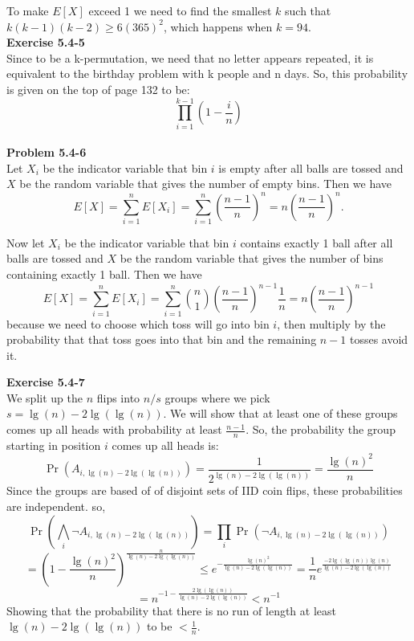 \documentclass{article}
\begin{document}
To make $E[X]$ exceed 1 we need to find the smallest $k$ such that $k(k-1)(k-2) \geq 6(365)^2$, which happens when $k = 94$.\\

\noindent\textbf{Exercise 5.4-5}\\

Since to be a k-permutation, we need that no letter appears repeated, it is equivalent to the birthday problem with k people and n days. So, this probability is given on the top of page 132 to be:
\[
\prod_{i=1}^{k-1} \left(1-\frac{i}{n}\right)
\]\\

\noindent\textbf{Problem 5.4-6}\\

Let $X_i$ be the indicator variable that bin $i$ is empty after all balls are tossed and $X$ be the random variable that gives the number of empty bins.  Then we have
\[ E[X] = \sum_{i=1}^n E[X_i] = \sum_{i=1}^n \left(\frac{n-1}{n}\right)^n = n\left(\frac{n-1}{n}\right)^n.\]

Now let $X_i$ be the indicator variable that bin $i$ contains exactly 1 ball after all balls are tossed and $X$ be the random variable that gives the number of bins containing exactly 1 ball.  Then we have
\[ E[X] = \sum_{i=1}^n E[X_i] = \sum_{i=1}^n {n \choose 1}\left(\frac{n-1}{n}\right)^{n-1}\frac{1}{n} = n\left(\frac{n-1}{n}\right)^{n-1} \]
because we need to choose which toss will go into bin $i$, then multiply by the probability that that toss goes into that bin and the remaining $n-1$ tosses avoid it.

\noindent\textbf{Exercise 5.4-7}\\

We split up the $n$ flips into $n/s$ groups where we pick $s = \lg(n) - 2\lg(\lg(n))$. We will show that at least one of these groups comes up all heads with probability at least $\frac{n-1}{n}$. So, the probability the group starting in position $i$ comes up all heads is:
\[
\Pr(A_{i,\lg(n)- 2\lg(\lg(n))}) =\frac{1}{2^{\lg(n)- 2\lg(\lg(n))}} = \frac{\lg(n)^2}{n}
\]
Since the groups are based of of disjoint sets of IID coin flips, these probabilities are independent. so, 
\[
\Pr(\bigwedge_{i} \neg A_{i,\lg(n)- 2\lg(\lg(n))}) = \prod_i \Pr(\neg A_{i,\lg(n)- 2\lg(\lg(n))}) \]\[= \left(1 - \frac{\lg(n)^2}{n}\right)^{\frac{n}{\lg(n) - 2\lg(\lg(n))}} \le e^{-\frac{\lg(n)^2}{\lg(n) - 2\lg(\lg(n))}} = \frac{1}{n}e^{\frac{-2\lg(\lg(n))\lg(n)}{\lg(n) - 2\lg(\lg(n))}} 
\]
\[
= n^{-1 - \frac{2\lg(\lg(n))}{\lg(n) - 2\lg(\lg(n))}} < n^{-1}
\]
Showing that the probability that there is no run of length at least $\lg(n) - 2\lg(\lg(n))$ to be $<\frac{1}{n}$.\\
\end{document}
